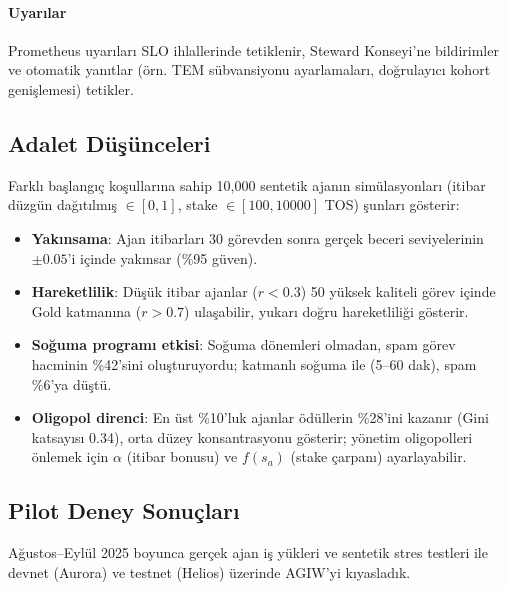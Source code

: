 \documentclass[11pt]{article}
\begin{document}
\paragraph{Uyarılar} Prometheus uyarıları SLO ihlallerinde tetiklenir, Steward Konseyi'ne bildirimler ve otomatik yanıtlar (örn. TEM sübvansiyonu ayarlamaları, doğrulayıcı kohort genişlemesi) tetikler.

\subsection{Adalet Düşünceleri}
Farklı başlangıç koşullarına sahip 10,000 sentetik ajanın simülasyonları (itibar düzgün dağıtılmış $\in [0,1]$, stake $\in [100, 10000]$ TOS) şunları gösterir:
\begin{itemize}[noitemsep]
  \item \textbf{Yakınsama}: Ajan itibarları 30 görevden sonra gerçek beceri seviyelerinin $\pm0.05$'i içinde yakınsar (\%95 güven).
  \item \textbf{Hareketlilik}: Düşük itibar ajanlar ($r<0.3$) 50 yüksek kaliteli görev içinde Gold katmanına ($r>0.7$) ulaşabilir, yukarı doğru hareketliliği gösterir.
  \item \textbf{Soğuma programı etkisi}: Soğuma dönemleri olmadan, spam görev hacminin \%42'sini oluşturuyordu; katmanlı soğuma ile (5--60 dak), spam \%6'ya düştü.
  \item \textbf{Oligopol direnci}: En üst \%10'luk ajanlar ödüllerin \%28'ini kazanır (Gini katsayısı 0.34), orta düzey konsantrasyonu gösterir; yönetim oligopolleri önlemek için $\alpha$ (itibar bonusu) ve $f(s_a)$ (stake çarpanı) ayarlayabilir.
\end{itemize}

\subsection{Pilot Deney Sonuçları}
\label{sec:pilot-results}
Ağustos--Eylül 2025 boyunca gerçek ajan iş yükleri ve sentetik stres testleri ile devnet (Aurora) ve testnet (Helios) üzerinde AGIW'yi kıyasladık.
\end{document}
